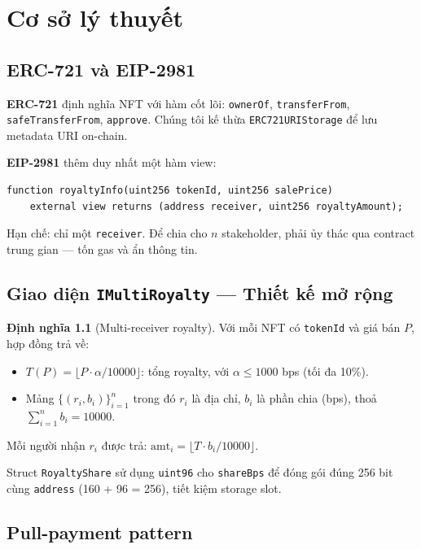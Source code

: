 \documentclass[12pt,a4paper,oneside]{report}
\theoremstyle{plain}
\theoremstyle{definition}
\newtheorem{definition}[theorem]{Định nghĩa}
\theoremstyle{remark}
\begin{document}
\chapter{Cơ sở lý thuyết}
\label{chap:background}

\section{ERC-721 và EIP-2981}
\textbf{ERC-721} định nghĩa NFT với hàm cốt lõi: \texttt{ownerOf}, \texttt{transferFrom},
\texttt{safeTransferFrom}, \texttt{approve}. Chúng tôi kế thừa \texttt{ERC721URIStorage} để lưu
metadata URI on-chain.

\textbf{EIP-2981} thêm duy nhất một hàm view:
\begin{lstlisting}[language=Solidity,numbers=none]
function royaltyInfo(uint256 tokenId, uint256 salePrice)
    external view returns (address receiver, uint256 royaltyAmount);
\end{lstlisting}
Hạn chế: chỉ một \texttt{receiver}. Để chia cho $n$ stakeholder, phải ủy thác qua contract
trung gian — tốn gas và ẩn thông tin.

\section{Giao diện \texttt{IMultiRoyalty} — Thiết kế mở rộng}

\begin{definition}[Multi-receiver royalty]\label{def:multiroy}
Với mỗi NFT có \texttt{tokenId} và giá bán $P$, hợp đồng trả về:
\begin{itemize}
  \item $T(P) = \lfloor P \cdot \alpha / 10000 \rfloor$: tổng royalty, với $\alpha \le 1000$ bps (tối đa 10\%).
  \item Mảng $\{(r_i, b_i)\}_{i=1}^{n}$ trong đó $r_i$ là địa chỉ, $b_i$ là phần chia (bps),
        thoả $\sum_{i=1}^{n} b_i = 10000$.
\end{itemize}
Mỗi người nhận $r_i$ được trả: $\text{amt}_i = \lfloor T \cdot b_i / 10000 \rfloor$.
\end{definition}

Struct \texttt{RoyaltyShare} sử dụng \texttt{uint96} cho \texttt{shareBps} để đóng gói đúng
256 bit cùng \texttt{address} (160 + 96 = 256), tiết kiệm storage slot.

\section{Pull-payment pattern}
\end{document}
